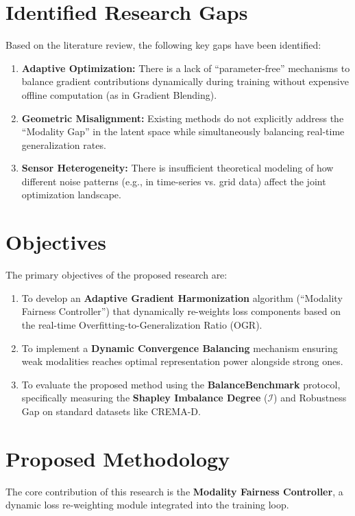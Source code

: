 \documentclass[11pt, a4paper]{article}
\begin{document}
\section{Identified Research Gaps}
Based on the literature review, the following key gaps have been identified:
\begin{enumerate}
    \item \textbf{Adaptive Optimization:} There is a lack of ``parameter-free'' mechanisms to balance gradient contributions dynamically during training without expensive offline computation (as in Gradient Blending).
    \item \textbf{Geometric Misalignment:} Existing methods do not explicitly address the ``Modality Gap'' in the latent space while simultaneously balancing real-time generalization rates.
    \item \textbf{Sensor Heterogeneity:} There is insufficient theoretical modeling of how different noise patterns (e.g., in time-series vs. grid data) affect the joint optimization landscape.
\end{enumerate}

\section{Objectives}
The primary objectives of the proposed research are:
\begin{enumerate}
    \item To develop an \textbf{Adaptive Gradient Harmonization} algorithm (``Modality Fairness Controller'') that dynamically re-weights loss components based on the real-time Overfitting-to-Generalization Ratio (OGR).
    \item To implement a \textbf{Dynamic Convergence Balancing} mechanism ensuring weak modalities reaches optimal representation power alongside strong ones.
    \item To evaluate the proposed method using the \textbf{BalanceBenchmark} protocol, specifically measuring the \textbf{Shapley Imbalance Degree} ($\mathcal{I}$) and Robustness Gap on standard datasets like CREMA-D.
\end{enumerate}

\section{Proposed Methodology}
The core contribution of this research is the \textbf{Modality Fairness Controller}, a dynamic loss re-weighting module integrated into the training loop.
\end{document}
